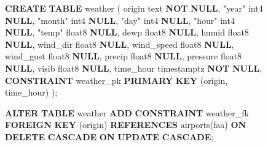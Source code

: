 \documentclass[
  10pt,
  titlepage=false]{exam}
\newenvironment{Shaded}{\begin{snugshade}}{\end{snugshade}}
\newcommand{\KeywordTok}[1]{\textcolor[rgb]{0.00,0.23,0.31}{\textbf{#1}}}
\newcommand{\NormalTok}[1]{\textcolor[rgb]{0.00,0.23,0.31}{#1}}
\newcommand{\OtherTok}[1]{\textcolor[rgb]{0.00,0.23,0.31}{#1}}
\begin{document}
\begin{figure}
\begin{minipage}{0.50\linewidth}
\begin{Shaded}
\begin{Highlighting}[]
\KeywordTok{CREATE} \KeywordTok{TABLE}\NormalTok{ weather (}
\NormalTok{    origin text }\KeywordTok{NOT} \KeywordTok{NULL}\NormalTok{,}
    \OtherTok{"year"}\NormalTok{ int4 }\KeywordTok{NULL}\NormalTok{,}
    \OtherTok{"month"}\NormalTok{ int4 }\KeywordTok{NULL}\NormalTok{,}
    \OtherTok{"day"}\NormalTok{ int4 }\KeywordTok{NULL}\NormalTok{,}
    \OtherTok{"hour"}\NormalTok{ int4 }\KeywordTok{NULL}\NormalTok{,}
    \OtherTok{"temp"}\NormalTok{ float8 }\KeywordTok{NULL}\NormalTok{,}
\NormalTok{    dewp float8 }\KeywordTok{NULL}\NormalTok{,}
\NormalTok{    humid float8 }\KeywordTok{NULL}\NormalTok{,}
\NormalTok{    wind\_dir float8 }\KeywordTok{NULL}\NormalTok{,}
\NormalTok{    wind\_speed float8 }\KeywordTok{NULL}\NormalTok{,}
\NormalTok{    wind\_gust float8 }\KeywordTok{NULL}\NormalTok{,}
\NormalTok{    precip float8 }\KeywordTok{NULL}\NormalTok{,}
\NormalTok{    pressure float8 }\KeywordTok{NULL}\NormalTok{,}
\NormalTok{    visib float8 }\KeywordTok{NULL}\NormalTok{,}
\NormalTok{    time\_hour timestamptz }\KeywordTok{NOT} \KeywordTok{NULL}\NormalTok{,}
    \KeywordTok{CONSTRAINT}\NormalTok{ weather\_pk }
        \KeywordTok{PRIMARY} \KeywordTok{KEY}\NormalTok{ (origin, time\_hour)}
\NormalTok{);}
\end{Highlighting}
\end{Shaded}

\begin{Shaded}
\begin{Highlighting}[]
\KeywordTok{ALTER} \KeywordTok{TABLE}\NormalTok{ weather }\KeywordTok{ADD} 
    \KeywordTok{CONSTRAINT}\NormalTok{ weather\_fk }
    \KeywordTok{FOREIGN} \KeywordTok{KEY}\NormalTok{ (origin) }
    \KeywordTok{REFERENCES}\NormalTok{ airports(faa) }
    \KeywordTok{ON} \KeywordTok{DELETE} \KeywordTok{CASCADE} 
    \KeywordTok{ON} \KeywordTok{UPDATE} \KeywordTok{CASCADE}\NormalTok{;}
\end{Highlighting}
\end{Shaded}

\end{minipage}%

\end{figure}%
\end{document}
